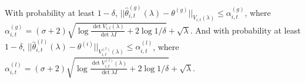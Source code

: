 \begin{lemma}\label{lem:confidence_ellipsoid}
With probability at least $1-\delta$, $||\hat{\theta}^{(g)}_{i,t}(\lambda) - \theta^{(g)}||_{V_{i,t}(\lambda)} \leq \alpha^{(g)}_{i,t}$, 
where $\alpha^{(g)}_{i,t} = (\sigma+2) \sqrt{\log{\frac{\det{V_{i,t}(\lambda)}}{\det{\lambda I}}}+2\log{1/\delta}}+\sqrt{\lambda}$. 
And with probability at least $1-\delta$, $||\hat{\theta}^{(l)}_{i,t}(\lambda) - \theta^{(i)}||_{V^{(l)}_{i,t}(\lambda)} \leq \alpha^{(l)}_{i,t}$, 
where $\alpha^{(l)}_{i,t} =  (\sigma+2) \sqrt{\log{\frac{\det{V^{(l)}_{i,t}(\lambda)}}{\det{\lambda I}}+2\log{1/\delta}}}+\sqrt{\lambda}$.
\end{lemma}


